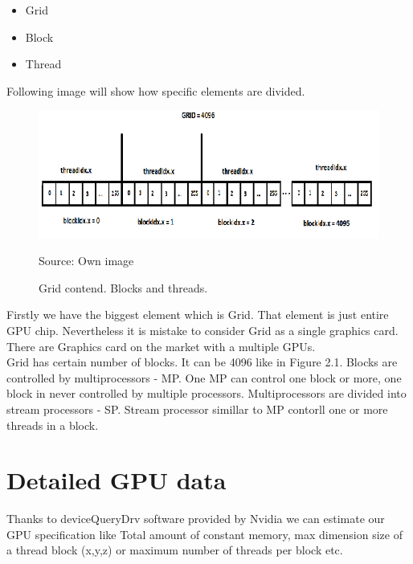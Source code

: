 \documentclass{scrreprt}
\begin{document}
\begin{itemize}
	\item Grid
	\item Block
	\item Thread
\end{itemize}  

Following image will show how specific elements are divided.

\begin{figure}[h!]
\centering
\includegraphics{CUDABlocksAndThreads.png}
\caption{Grid contend. Blocks and threads.}
Source: Own image
\end{figure}
\FloatBarrier

Firstly we have the biggest element which is Grid. 
That element is just entire GPU chip. Nevertheless it is mistake to consider Grid as a single graphics card.
There are Graphics card on the market with a multiple GPUs.
\\
Grid has certain number of blocks. It can be 4096 like in Figure 2.1. 
Blocks are controlled by multiprocessors - MP. One MP can control one block or more, one block in never controlled by multiple processors.
Multiprocessors are divided into stream processors - SP. Stream processor simillar to MP contorll one or more threads in a block.

\section{Detailed GPU data}
Thanks to deviceQueryDrv software provided by Nvidia we can estimate our GPU specification like Total amount of constant memory, max dimension size of a thread block (x,y,z) or maximum number of threads per block etc.\\
\end{document}
